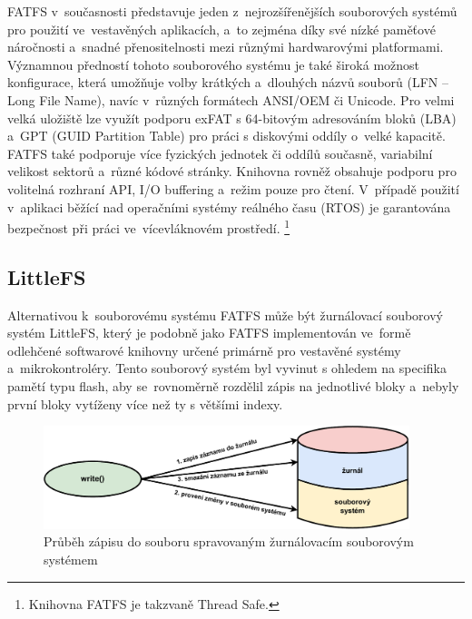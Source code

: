 FATFS v~současnosti představuje jeden z~nejrozšířenějších souborových systémů pro použití ve~vestavěných aplikacích, a~to zejména díky své nízké paměťové náročnosti a~snadné přenositelnosti mezi různými hardwarovými platformami. Významnou předností tohoto souborového systému je také široká možnost konfigurace, která umožňuje volby krátkých a~dlouhých názvů souborů (LFN -- Long File Name), navíc v~různých formátech ANSI/OEM či Unicode. Pro velmi velká uložiště lze využít podporu exFAT s 64-bitovým adresováním bloků (LBA) a~GPT (GUID Partition Table) pro práci s diskovými oddíly o~velké kapacitě. FATFS také podporuje více fyzických jednotek či oddílů současně, variabilní velikost sektorů a~různé kódové stránky. Knihovna rovněž obsahuje podporu pro volitelná rozhraní API, I/O buffering a~režim pouze pro čtení. V~případě použití v~aplikaci běžící nad operačními systémy reálného času (RTOS) je garantována bezpečnost při práci ve~vícevláknovém prostředí. \footnote{Knihovna FATFS je takzvaně Thread Safe.}~\cite{elm_fat_filesystem_module}


\subsection{LittleFS}
Alternativou k~souborovému systému FATFS může být žurnálovací souborový systém LittleFS, který je podobně jako FATFS implementován ve~formě odlehčené softwarové knihovny určené primárně pro vestavěné systémy a~mikrokontroléry.  Tento souborový systém byl vyvinut s ohledem na specifika pamětí typu flash, aby se~rovnoměrně rozdělil zápis na jednotlivé bloky a~nebyly první bloky vytíženy více než ty s většími indexy.~\cite{nxp_the_design_of_the_little_filesystem}

\begin{figure}[h]
    \centering
    \includegraphics[width=0.95\textwidth]{obrazky-figures/journaling-cz.pdf}
    
    \caption{Průběh zápisu do souboru spravovaným žurnálovacím souborovým systémem~\cite{architecture_and_design_of_the_linux_storage_stack}}
    \label{fig:journaling}
\end{figure}


